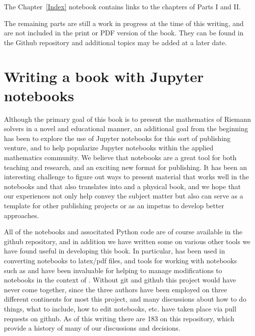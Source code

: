\documentclass{SIAMbook2016}
\begin{document}
The Chapter~\ref{Index} notebook contains links to the chapters of Parts I
and II.

The remaining parts are still a work in progress at the time of this
writing, and are not included in the print or PDF version of the book.
They can be found in the Github repository and additional topics may be
added at a later date.

\hypertarget{writing-a-book-with-jupyter-notebooks}{%
\section{Writing a book with Jupyter
notebooks}\label{writing-a-book-with-jupyter-notebooks}}

Although the primary goal of this book is to present the mathematics of
Riemann solvers in a novel and educational manner, an additional goal
from the beginning has been to explore the use of Jupyter notebooks for
this sort of publishing venture, and to help popularize Jupyter
notebooks within the applied mathematics community. We believe that
notebooks are a great tool for both teaching and research, and an
exciting new format for publishing. It has been an interesting challenge
to figure out ways to present material that works well in the notebooks
and that also translates into
and a physical book, and we hope that our experiences not only help
convey the subject matter but also can serve as a template for other
publishing projects or as an impetus to develop better approaches.

All of the notebooks and associtated Python code are of course available
in the github repository, and in addition we have written some
 on
various other tools we have found useful in developing this book. In
particular,  has
been used in converting notebooks to latex/pdf files, and tools for
working with notebooks such as
 and
 have been
invaluable for helping to manage modifications to notebooks in the
context of . Without git and github this
project would have never come together, since the three authors have
been employed on three different continents for most this project, and
many discussions about how to do things, what to include, how to edit
notebooks, etc. have taken place via pull requests on github. As of this
writing there are 183
 on this repository, which provide a history of many of
our discussions and decisions.
\end{document}
